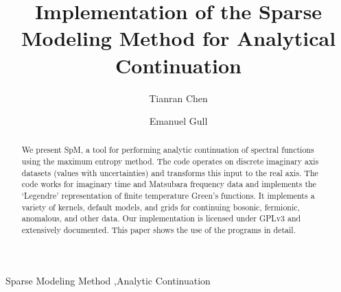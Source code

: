 \documentclass[final,5p,twocolumn,12pt]{elsarticle}
\begin{document}
\begin{frontmatter}



\title{Implementation of the Sparse Modeling Method for Analytical Continuation}


\author[a]{Tianran Chen}
\author[b]{Emanuel Gull}

\address[a]{Department of Physics, West Chester University, PA 19380, USA}
\address[b]{Department of Physics, University of Michigan, Ann Arbor, MI 48109, USA}

\begin{abstract}
We present SpM, a tool for performing analytic continuation of spectral functions using the maximum entropy method. The code operates on discrete imaginary axis datasets (values with uncertainties) and transforms this input to the real axis. The code works for imaginary time and Matsubara frequency data and implements the `Legendre' representation of finite temperature Green's functions. It implements a variety of kernels, default models, and grids for continuing bosonic, fermionic, anomalous, and other data. Our implementation is licensed under GPLv3 and extensively documented. This paper shows the use of the programs in detail.
\end{abstract}

\begin{keyword}
Sparse Modeling Method \sep Analytic Continuation
\end{keyword}

\end{frontmatter}
\end{document}
